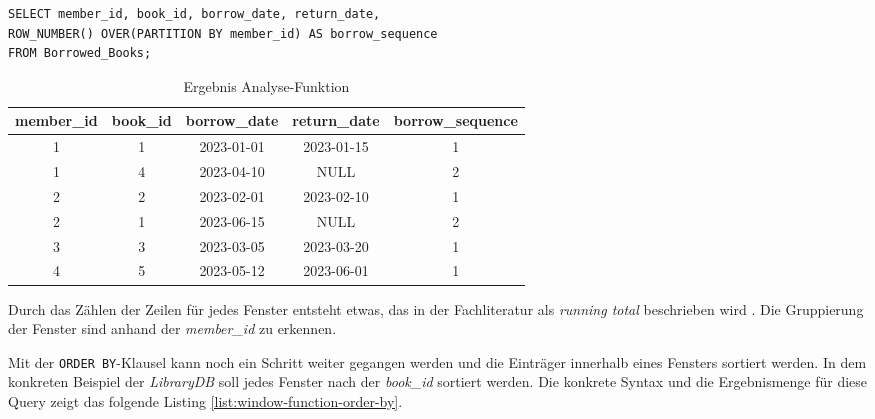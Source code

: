 \begin{lstlisting}
SELECT member_id, book_id, borrow_date, return_date,
ROW_NUMBER() OVER(PARTITION BY member_id) AS borrow_sequence
FROM Borrowed_Books;
\end{lstlisting}
\begin{table}[h]
	\centering
	\begin{tabular}{|c|c|c|c|c|}
		\hline
		\textbf{member\_id} & \textbf{book\_id} & \textbf{borrow\_date} & \textbf{return\_date} & \textbf{borrow\_sequence} \\
		\hline
		1                   & 1                 & 2023-01-01            & 2023-01-15            & 1                         \\
		\hline
		1                   & 4                 & 2023-04-10            & NULL                  & 2                         \\
		\hline
		2                   & 2                 & 2023-02-01            & 2023-02-10            & 1                         \\
		\hline
		2                   & 1                 & 2023-06-15            & NULL                  & 2                         \\
		\hline
		3                   & 3                 & 2023-03-05            & 2023-03-20            & 1                         \\
		\hline
		4                   & 5                 & 2023-05-12            & 2023-06-01            & 1                         \\
		\hline
	\end{tabular}
	\caption{Ergebnis Analyse-Funktion}
	\label{tab:ergebnnis_analyse_funktion}
\end{table}

Durch das Zählen der Zeilen für jedes Fenster entsteht etwas, das in der Fachliteratur
als \textit{running total} beschrieben wird \citep[vgl.][S. 37]{Nuijten2023}.
Die Gruppierung der Fenster sind anhand der \textit{member\_id} zu erkennen.

Mit der \texttt{ORDER BY}-Klausel kann noch ein Schritt weiter gegangen werden
und die Einträger innerhalb eines Fensters sortiert werden. In dem konkreten Beispiel
der \textit{LibraryDB} soll jedes Fenster nach der \textit{book\_id} sortiert werden.
Die konkrete Syntax und die Ergebnismenge für diese Query zeigt das folgende
Listing \ref{list:window-function-order-by}.

